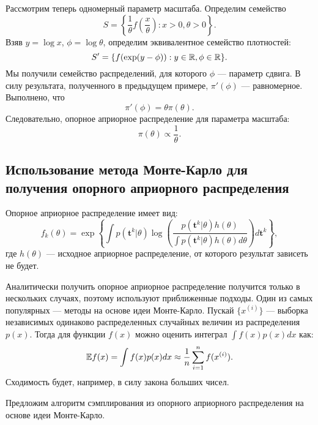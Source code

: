 \begin{example}
Рассмотрим теперь одномерный параметр масштаба.
Определим семейство 
\[
S = \left\{\frac{1}{\theta} f \left( \frac{x}{\theta} \right) : x > 0, \theta > 0 \right\}.
\]
Взяв $y = \log x$, $\phi = \log \theta$, определим эквивалентное семейство плотностей:
\[
S' = \{f(\exp(y - \phi)): y \in \mathbb{R}, \phi \in \mathbb{R} \}.
\]
Мы получили семейство распределений, для которого $\phi$ --- параметр сдвига. 
В силу результата, полученного в предыдущем примере, $\pi'(\phi)$ --- равномерное.
Выполнено, что 
\[
\pi'(\phi) = \theta \pi(\theta).
\]
Следовательно, опорное априорное распределение для параметра масштаба:
\[
\pi(\theta) \propto \frac{1}{\theta}.
\]
\end{example}

\subsection{Использование метода Монте-Карло для получения опорного априорного распределения}

Опорное априорное распределение имеет вид:
\[
f_k(\theta) = \exp \left\{\int p(\mathbf{t}^k | \theta) \log \left( \frac{p(\mathbf{t}^k | \theta) h(\theta)}{\int p(\mathbf{t}^k | \theta) h(\theta) d \theta}\right) d \mathbf{t}^k \right\},
\]
где $h(\theta)$ --- исходное априорное распределение, от которого результат зависеть не будет.

Аналитически получить опорное априорное распределение получится только в нескольких случаях, поэтому используют приближенные подходы.
Один из самых популярных --- методы на основе идеи Монте-Карло.
Пускай $\{x^{(i)}\}$ --- выборка независимых одинаково распределенных случайных величин из распределения $p(x)$.
Тогда для функции $f(x)$ можно оценить интеграл $\int f(x) p(x) dx$ как:
\[
\mathbb{E} f(x) = \int f(x) p(x) dx \approx \frac{1}{n} \sum_{i = 1}^{n} f(x^{(i)}).
\]
Сходимость будет, например, в силу закона больших чисел.

Предложим алгоритм сэмплирования из опорного априорного распределения на основе идеи Монте-Карло.

